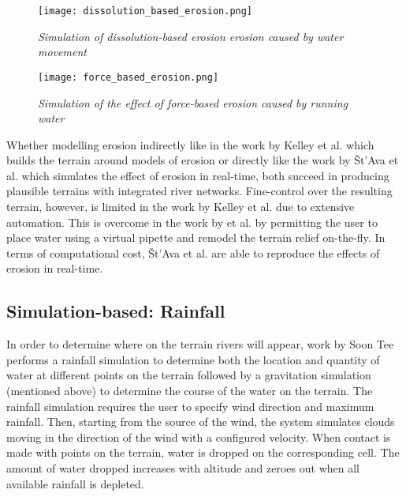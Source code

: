 \begin{figure}[h]
  \centering
	\texttt{[image: dissolution\_based\_erosion.png]}
	\caption{\textit{Simulation of dissolution-based erosion erosion caused by water movement\cite{StAva2008}}}
	\label{fig:dissolution_based_erosion}
\end{figure}

\begin{figure}[h]
  \centering
	\texttt{[image: force\_based\_erosion.png]}
	\caption{\textit{Simulation of the effect of force-based erosion caused by running water \cite{StAva2008}}}
	\label{fig:force_based_erosion}
\end{figure}

Whether modelling erosion indirectly like in the work by Kelley et al. \cite{Kelley1988} which builds the terrain around models of erosion or directly like the work by Št'Ava et al. \cite{StAva2008} which simulates the effect of erosion in real-time, both succeed in producing plausible terrains with integrated river networks. Fine-control over the resulting terrain, however, is limited in the work by Kelley et al. \cite{Kelley1988} due to extensive automation. This is overcome in the work by \cite{StAva2008} et al. by permitting the user to place water using a virtual pipette and remodel the terrain relief on-the-fly. In terms of computational cost, Št'Ava et al. \cite{StAva2008} are able to reproduce the effects of erosion in real-time.  

\subsection{Simulation-based: Rainfall}

In order to determine where on the terrain rivers will appear, work by Soon Tee \cite{Teoh2008} performs a rainfall simulation to determine both the location and quantity of water at different points on the terrain followed by a gravitation simulation (mentioned above) to determine the course of the water on the terrain. The rainfall simulation requires the user to specify wind direction and maximum rainfall. Then, starting from the source of the wind, the system simulates clouds moving in the direction of the wind with a configured velocity. When contact is made with points on the terrain, water is dropped on the corresponding cell. The amount of water dropped increases with altitude and zeroes out when all available rainfall is depleted. \\

